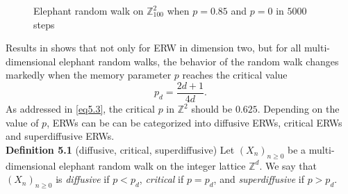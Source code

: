 \documentclass[
11pt, %
a4paper, %
oneside, %
headinclude,footinclude, %
BCOR5mm, %
]{scrartcl}
\begin{document}
\begin{figure}
    \centering
    \caption{Elephant random walk on $\mathbb{Z}_{100}^2$ when $p=0.85$ and $p=0$ in $5000$ steps} 
    \label{2derw}
\end{figure}
Results in \cite{bercu2019multi} shows that not only for ERW in dimension two, but for all multi-dimensional elephant random walks, the behavior of  the random walk changes markedly when the memory parameter $p$ reaches the critical value
\begin{equation}
    \label{eq5.3}
    p_d=\frac{2d+1}{4d}. \tag{5.3}
\end{equation}
As addressed in \eqref{eq5.3}, the critical $p$ in $\mathbb{Z}^2$ should be $0.625$. Depending on the value of $p$, ERWs can be can be categorized into diffusive ERWs, critical ERWs and superdiffusive ERWs.
\vspace{0.6em}\\\textbf{Definition 5.1} (diffusive, critical, superdiffusive) Let $(X_n)_{n \geq 0}$ be a multi-dimensional elephant random walk on the integer lattice $\mathbb{Z}^d$. We say that $(X_n)_{n \geq 0}$ is \textit{diffusive} if $p<p_d$, \textit{critical} if $p=p_d$, and \textit{superdiffusive} if $p>p_d$.
\end{document}
